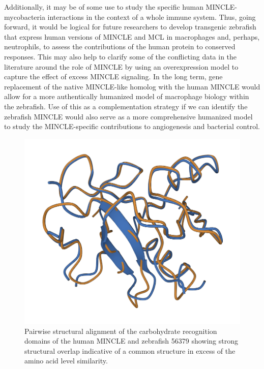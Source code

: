 Additionally, it may be of some use to study the specific human MINCLE\hyp{}mycobacteria interactions in the context of a whole immune system. Thus, going forward, it would be logical for future researchers to develop transgenic zebrafish that express human versions of MINCLE and MCL in macrophages and, perhaps, neutrophils, to assess the contributions of the human protein to conserved responses. This may also help to clarify some of the conflicting data in the literature around the role of MINCLE by using an overexpression model to capture the effect of excess MINCLE signaling. In the long term, gene replacement of the native MINCLE\hyp{}like homolog with the human MINCLE would allow for a more authentically humanized model of macrophage biology within the zebrafish. Use of this as a complementation strategy if we can identify the zebrafish MINCLE would also serve as a more comprehensive humanized model to study the MINCLE\hyp{}specific contributions to angiogenesis and bacterial control.

\begin{figure}
\centering
\includegraphics[width=\textwidth]{images/56379_align.png}
\caption[Structural alignment of MINCLE and 56379]{Pairwise structural alignment of the carbohydrate recognition domains of the human MINCLE and zebrafish 56379 showing strong structural overlap indicative of a common structure in excess of the amino acid level similarity.}
\label{figure:56379}
\end{figure}

